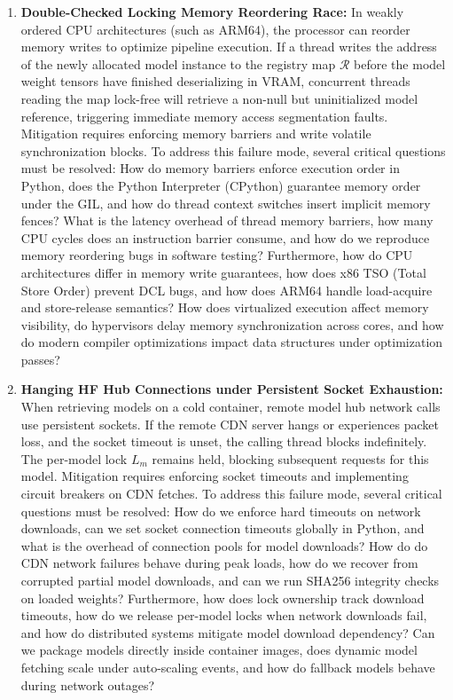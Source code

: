 \documentclass[11pt,a4paper]{article}
\theoremstyle{plain}
\theoremstyle{definition}
\theoremstyle{remark}
\newcommand{\Lm}{L_m}
\begin{document}
\begin{enumerate}[label=\textbf{CF\arabic*.}]
    \item \textbf{Double-Checked Locking Memory Reordering Race:} 
    In weakly ordered CPU architectures (such as ARM64), the processor can reorder memory writes to optimize pipeline execution. If a thread writes the address of the newly allocated model instance to the registry map $\mathcal{R}$ before the model weight tensors have finished deserializing in VRAM, concurrent threads reading the map lock-free will retrieve a non-null but uninitialized model reference, triggering immediate memory access segmentation faults.
    Mitigation requires enforcing memory barriers and write volatile synchronization blocks.
    To address this failure mode, several critical questions must be resolved: How do memory barriers enforce execution order in Python, does the Python Interpreter (CPython) guarantee memory order under the GIL, and how do thread context switches insert implicit memory fences? What is the latency overhead of thread memory barriers, how many CPU cycles does an instruction barrier consume, and how do we reproduce memory reordering bugs in software testing? Furthermore, how do CPU architectures differ in memory write guarantees, how does x86 TSO (Total Store Order) prevent DCL bugs, and how does ARM64 handle load-acquire and store-release semantics? How does virtualized execution affect memory visibility, do hypervisors delay memory synchronization across cores, and how do modern compiler optimizations impact data structures under optimization passes?

    \item \textbf{Hanging HF Hub Connections under Persistent Socket Exhaustion:} 
    When retrieving models on a cold container, remote model hub network calls use persistent sockets. If the remote CDN server hangs or experiences packet loss, and the socket timeout is unset, the calling thread blocks indefinitely. The per-model lock $\Lm$ remains held, blocking subsequent requests for this model.
    Mitigation requires enforcing socket timeouts and implementing circuit breakers on CDN fetches.
    To address this failure mode, several critical questions must be resolved: How do we enforce hard timeouts on network downloads, can we set socket connection timeouts globally in Python, and what is the overhead of connection pools for model downloads? How do do CDN network failures behave during peak loads, how do we recover from corrupted partial model downloads, and can we run SHA256 integrity checks on loaded weights? Furthermore, how does lock ownership track download timeouts, how do we release per-model locks when network downloads fail, and how do distributed systems mitigate model download dependency? Can we package models directly inside container images, does dynamic model fetching scale under auto-scaling events, and how do fallback models behave during network outages?

\end{enumerate}
\end{document}
